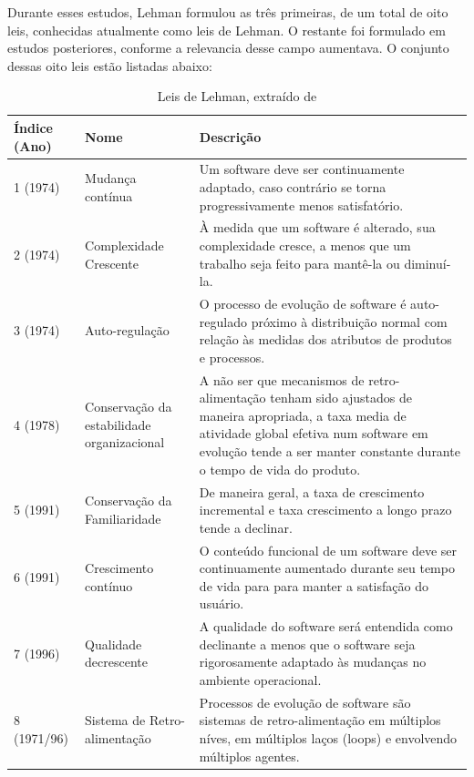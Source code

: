 Durante esses estudos, Lehman formulou as três primeiras, de um total de oito leis, conhecidas atualmente como leis de Lehman. O restante foi formulado em estudos posteriores, conforme a relevancia desse campo aumentava. O conjunto dessas oito leis estão listadas abaixo:
\begin{table}[H]
\begin{center}
    \begin{tabular}{ | l | p{4cm} | p{9cm} |}
    \hline
    Índice (Ano) & Nome & Descrição \\ \hline
    1 (1974) & Mudança contínua & Um software deve ser continuamente adaptado, caso contrário se torna progressivamente menos satisfatório. \\ \hline
    2 (1974) & Complexidade Crescente & À medida que um software é alterado, sua complexidade cresce, a menos que um trabalho seja feito para mantê-la ou diminuí-la. \\ \hline
    3 (1974) & Auto-regulação & O processo de evolução de software é auto-regulado próximo à distribuição normal com relação às medidas dos atributos de produtos e processos. \\ \hline
    4 (1978) & Conservação da estabilidade organizacional & A não ser que mecanismos de retro-alimentação tenham sido ajustados de maneira apropriada, a taxa media de atividade global efetiva num software em evolução tende a ser manter constante durante o tempo de vida do produto. \\ \hline
    5 (1991) & Conservação da Familiaridade & De maneira geral, a taxa de crescimento incremental e taxa crescimento a longo prazo tende a declinar. \\ \hline
    6 (1991) & Crescimento contínuo & O conteúdo funcional de um software deve ser continuamente aumentado durante seu tempo de vida para para manter a satisfação do usuário. \\ \hline
    7 (1996) & Qualidade decrescente & A qualidade do software será entendida como declinante a menos que o software seja rigorosamente adaptado às mudanças no ambiente operacional. \\ \hline
    8 (1971/96) & Sistema de Retro-alimentação & Processos de evolução de software são sistemas de retro-alimentação em múltiplos níves, em múltiplos laços (loops) e envolvendo múltiplos agentes. \\ \hline
    \end{tabular}
    \caption{Leis de Lehman, extraído de \cite{fernandez2008empirical}}
    \label{tab-leis-lehman}
\end{center}
\end{table}

